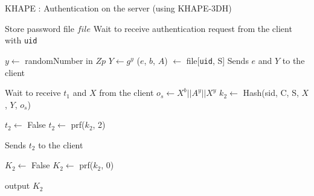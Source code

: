 \documentclass[../report.tex]{subfiles}
\begin{document}
\begin{algorithm}
\caption{KHAPE : Authentication on the server (using KHAPE-3DH)}
\label{euclid}
\begin{algorithmic}
\Require Store password file $file$
\State Wait to receive authentication request from the client with \verb|uid|

\State $y \gets$ randomNumber in $Zp$
\State $Y \gets g^y$
\State ($e$, $b$, $A$) $\gets$ file[\verb|uid|, S] %
\State Sends $e$ and $Y$ to the client


\State Wait to receive $t_1$ and $X$ from the client
\State $o_s \gets X^b || A^y || X^y$
\State $k_2 \gets$ Hash(sid, C, S, $X$, $Y$, $o_s$)


    \State $t_2 \gets$ False
\Else
    \State $t_2 \gets$ prf($k_2$, 2)
\EndIf


\State Sends $t_2$ to the client


    \State $K_2 \gets$ False
\Else
    \State $K_2 \gets$ prf($k_2$, 0)
\EndIf

\State output $K_2$
\end{algorithmic}
\end{algorithm}




\end{document}
